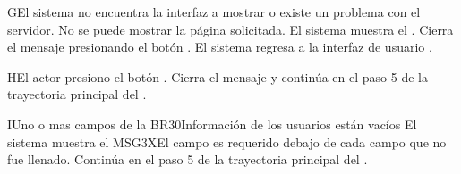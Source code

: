 \begin{UCtrayectoriaA}{G}{El sistema no encuentra la interfaz a mostrar o existe un problema con el servidor.}
    \UCpaso No se puede mostrar la página solicitada.
    \UCpaso El sistema muestra el .
    \UCpaso[\UCactor] Cierra el mensaje presionando el botón .
    \UCpaso El sistema regresa a la interfaz de usuario .
\end{UCtrayectoriaA}
\begin{UCtrayectoriaA}{H}{El actor presiono el botón .}
	\UCpaso Cierra el mensaje y continúa en el paso 5 de la trayectoria principal del .	
\end{UCtrayectoriaA}
\begin{UCtrayectoriaA}{I}{Uno o mas campos de la {BR30}{Información de los usuarios}  están vacíos }
	\UCpaso El sistema muestra el {MSG3X}{El campo es requerido} debajo de cada campo que no fue llenado. 
	\UCpaso	Continúa en el paso 5 de la trayectoria principal del .
\end{UCtrayectoriaA}